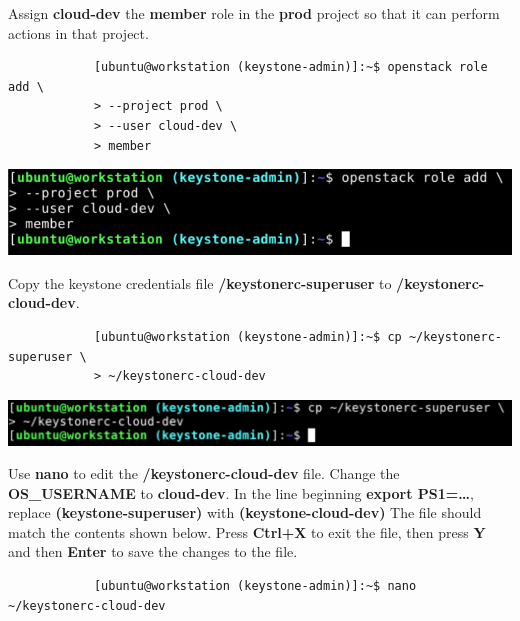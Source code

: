 \documentclass[letterpaper, 12pt]{article}
\begin{document}
\begin{enumerate}
    \begin{labstep}
        Assign \textbf{cloud-dev} the \textbf{member} role in the \textbf{prod} project so that it can perform actions in that project.
        \begin{lstlisting}
            [ubuntu@workstation (keystone-admin)]:~$ openstack role add \
            > --project prod \
            > --user cloud-dev \
            > member
        \end{lstlisting}

        \begin{center}
            \includegraphics[width=\linewidth]{images/part1/step10.png}
        \end{center}
    \end{labstep}

    \begin{labstep}
        Copy the keystone credentials file \textbf{\texttildemid/keystonerc-superuser} to \textbf{\texttildemid/keystonerc-cloud-dev}.
        \begin{lstlisting}
            [ubuntu@workstation (keystone-admin)]:~$ cp ~/keystonerc-superuser \
            > ~/keystonerc-cloud-dev
        \end{lstlisting}

        \begin{center}
            \includegraphics[width=\linewidth]{images/part1/step11.png}
        \end{center}
    \end{labstep}

    \begin{labstep}
        Use \textbf{nano} to edit the \textbf{\texttildemid/keystonerc-cloud-dev} file.
        Change the \textbf{OS\_USERNAME} to \textbf{cloud-dev}.
        In the line beginning \textbf{export PS1=…}, replace \textbf{(keystone-superuser)} with \textbf{(keystone-cloud-dev)} The file should match the contents shown below.
        Press \textbf{Ctrl+X} to exit the file, then press \textbf{Y} and then \textbf{Enter} to save the changes to the file.
        \begin{lstlisting}
            [ubuntu@workstation (keystone-admin)]:~$ nano ~/keystonerc-cloud-dev
        \end{lstlisting}


\end{labstep}
\end{enumerate}
\end{document}
